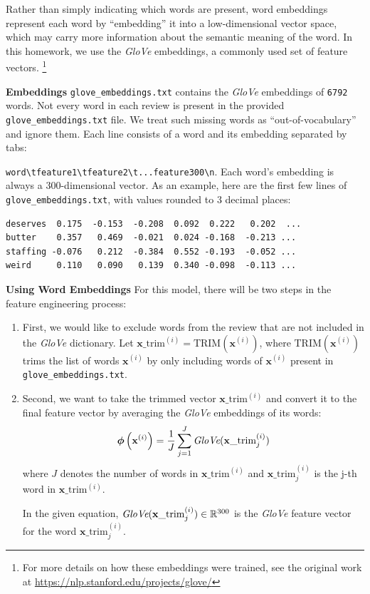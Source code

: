 \documentclass[11pt,addpoints,answers]{exam}
\newcommand{\xv}{\mathbf{x}}
\begin{document}
Rather than simply indicating which words are present, word embeddings represent each word by ``embedding'' it into a low-dimensional vector space, which may carry more information about the semantic meaning of the word. In this homework, we use the \emph{GloVe} embeddings, a commonly used set of feature vectors. \footnote{For more details on how these embeddings were trained, see the original work at   \url{https://nlp.stanford.edu/projects/glove/}}

{\bf Embeddings }
\texttt{glove\_embeddings.txt} contains the \emph{GloVe} embeddings of \texttt{6792} words. 
Not every word in each review is present in the provided \texttt{glove\_embeddings.txt} file. We treat such missing words as ``out-of-vocabulary'' and ignore them. Each line consists of a word and its embedding separated by tabs:

\lstinline{word\tfeature1\tfeature2\t...feature300\n}. Each word's embedding is always a 300-dimensional vector. As an example, here are the first few lines of \texttt{glove\_embeddings.txt}, with values rounded to 3 decimal places:
\begin{lstlisting}
deserves  0.175  -0.153  -0.208  0.092  0.222   0.202  ...
butter    0.357   0.469  -0.021  0.024 -0.168  -0.213 ...
staffing -0.076   0.212  -0.384  0.552 -0.193  -0.052 ...
weird     0.110   0.090   0.139  0.340 -0.098  -0.113 ...     
\end{lstlisting}


{\bf Using Word Embeddings }
For this model, there will be two steps in the feature engineering process: 
    
\begin{enumerate}
    \item First, we would like to exclude words from the review that are not included in the  \emph{GloVe} dictionary. Let  $\xv\_\text{trim}^{(i)} = \text{TRIM}(\xv^{(i)})$, where $\text{TRIM}(\xv^{(i)})$ trims the list of words $\xv^{(i)}$ by only including words of $\xv^{(i)}$ present in \texttt{glove\_embeddings.txt}.
    \item Second, we want to take the trimmed vector $\xv\_\text{trim}^{(i)}$ and convert it to the final feature vector by averaging the  \emph{GloVe} embeddings of its words:
    $$\boldsymbol{\phi}\left(\xv^{(i)}\right) = \frac{1}{J} \sum_{j=1}^J \emph{GloVe}(\xv\_\text{trim}^{(i)}_j) $$
    where $J$ denotes the number of words in $\xv\_\text{trim}^{(i)}$ and $\xv\_\text{trim}^{(i)}_j$ is the j-th word in $\xv\_\text{trim}^{(i)}$.
    
     In the given equation, $\emph{GloVe}(\xv\_\text{trim}^{(i)}_j) \in \mathbb{R}^{300}$ is the \emph{GloVe} feature vector for the word $\xv\_\text{trim}^{(i)}_j$.
\end{enumerate}
    
\end{document}
